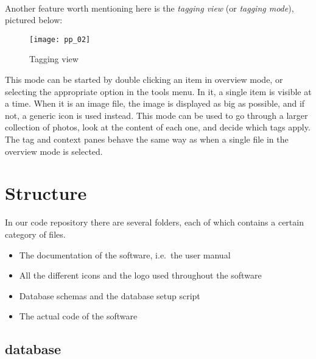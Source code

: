\paragraph{}
Another feature worth mentioning here is the \textit{tagging view} (or
\textit{tagging mode}), pictured below:

\begin{figure}
	\centering
	\texttt{[image: pp\_02]}
	\caption{Tagging view}
\end{figure}

This mode can be started by double clicking an item in overview mode, or
selecting the appropriate option in the tools menu. In it, a single item is
visible at a time. When it is an image file, the image is displayed as big as
possible, and if not, a generic icon is used instead. This mode can be used to
go through a larger collection of photos, look at the content of each one, and
decide which tags apply. The tag and context panes behave the same way as when
a single file in the overview mode is selected.




\section{Structure}
\def\kapitelautor{Clemens Stadlbauer}

In our code repository there are several folders, each of which contains a
certain category of files.

\begin{itemize}
	\item[\tfpath{doc/}] The documentation of the software, i.e.~the user manual
	\item[\tfpath{icons/}] All the different icons and the logo used throughout the software
	\item[\tfpath{db/}] Database schemas and the database setup script
	\item[\tfpath{src/}] The actual code of the software
\end{itemize}

\subsection{database}

